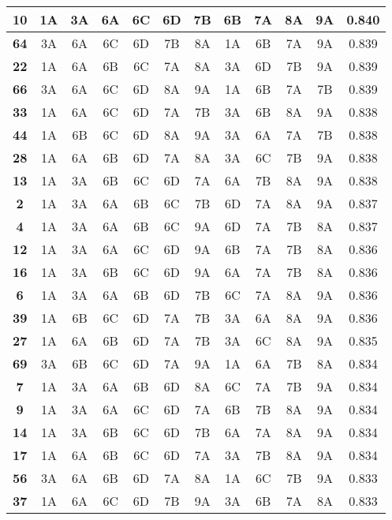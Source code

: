 \begin{table}
\begin{tabular}{|c||c|c|c|c|c|c||c|c|c|c||c|}
\hline
\textbf{10} & 1A & 3A & 6A & 6C & 6D & 7B & 6B & 7A & 8A & 9A & 0.840 \\
\hline
\textbf{64} & 3A & 6A & 6C & 6D & 7B & 8A & 1A & 6B & 7A & 9A & 0.839 \\
\hline
\textbf{22} & 1A & 6A & 6B & 6C & 7A & 8A & 3A & 6D & 7B & 9A & 0.839 \\
\hline
\textbf{66} & 3A & 6A & 6C & 6D & 8A & 9A & 1A & 6B & 7A & 7B & 0.839 \\
\hline
\textbf{33} & 1A & 6A & 6C & 6D & 7A & 7B & 3A & 6B & 8A & 9A & 0.838 \\
\hline
\textbf{44} & 1A & 6B & 6C & 6D & 8A & 9A & 3A & 6A & 7A & 7B & 0.838 \\
\hline
\textbf{28} & 1A & 6A & 6B & 6D & 7A & 8A & 3A & 6C & 7B & 9A & 0.838 \\
\hline
\textbf{13} & 1A & 3A & 6B & 6C & 6D & 7A & 6A & 7B & 8A & 9A & 0.838 \\
\hline
\textbf{2} & 1A & 3A & 6A & 6B & 6C & 7B & 6D & 7A & 8A & 9A & 0.837 \\
\hline
\textbf{4} & 1A & 3A & 6A & 6B & 6C & 9A & 6D & 7A & 7B & 8A & 0.837 \\
\hline
\textbf{12} & 1A & 3A & 6A & 6C & 6D & 9A & 6B & 7A & 7B & 8A & 0.836 \\
\hline
\textbf{16} & 1A & 3A & 6B & 6C & 6D & 9A & 6A & 7A & 7B & 8A & 0.836 \\
\hline
\textbf{6} & 1A & 3A & 6A & 6B & 6D & 7B & 6C & 7A & 8A & 9A & 0.836 \\
\hline
\textbf{39} & 1A & 6B & 6C & 6D & 7A & 7B & 3A & 6A & 8A & 9A & 0.836 \\
\hline
\textbf{27} & 1A & 6A & 6B & 6D & 7A & 7B & 3A & 6C & 8A & 9A & 0.835 \\
\hline
\textbf{69} & 3A & 6B & 6C & 6D & 7A & 9A & 1A & 6A & 7B & 8A & 0.834 \\
\hline
\textbf{7} & 1A & 3A & 6A & 6B & 6D & 8A & 6C & 7A & 7B & 9A & 0.834 \\
\hline
\textbf{9} & 1A & 3A & 6A & 6C & 6D & 7A & 6B & 7B & 8A & 9A & 0.834 \\
\hline
\textbf{14} & 1A & 3A & 6B & 6C & 6D & 7B & 6A & 7A & 8A & 9A & 0.834 \\
\hline
\textbf{17} & 1A & 6A & 6B & 6C & 6D & 7A & 3A & 7B & 8A & 9A & 0.834 \\
\hline
\textbf{56} & 3A & 6A & 6B & 6D & 7A & 8A & 1A & 6C & 7B & 9A & 0.833 \\
\hline
\textbf{37} & 1A & 6A & 6C & 6D & 7B & 9A & 3A & 6B & 7A & 8A & 0.833 \\

\end{tabular}
\end{table}
